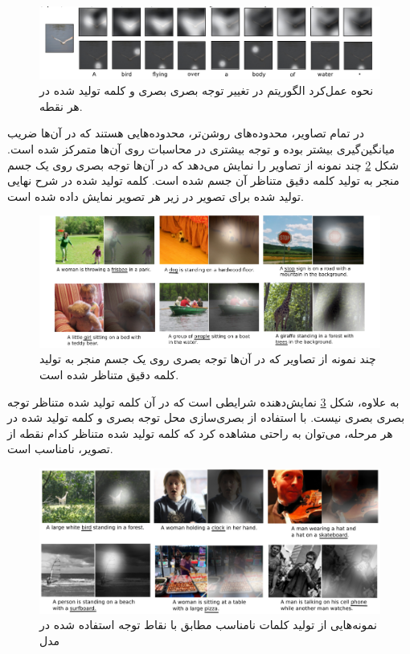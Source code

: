 \begin{figure}[h]
\centering
\includegraphics[scale=0.4]{Imgs/show1.png}
\caption{نحوه عمل‌کرد الگوریتم در تغییر توجه بصری بصری و کلمه تولید شده در هر نقطه. \cite{xu2015show}}
\label{fig:show1}
\end{figure}  
  
  در تمام تصاویر، محدوده‌های روشن‌تر، محدوده‌هایی هستند که در آن‌ها ضریب میانگین‌گیری بیشتر بوده و توجه بیشتری در محاسبات روی آن‌ها متمرکز شده است. شکل \ref{fig:show2} چند نمونه از تصاویر را نمایش می‌دهد که در آن‌ها توجه بصری روی یک جسم منجر به تولید کلمه دقیق متناظر آن جسم شده است. کلمه تولید شده در شرح نهایی تولید شده برای تصویر در زیر هر تصویر نمایش داده شده است.

\begin{figure}[h]
\centering
\includegraphics[scale=0.5]{Imgs/show2.png}
\caption{چند نمونه از تصاویر که در آن‌ها توجه بصری روی یک جسم منجر به تولید کلمه دقیق متناظر شده است\cite{xu2015show}. }
\label{fig:show2}
\end{figure}

  به علاوه، شکل \ref{fig:show3} نمایش‌دهنده شرایطی است که در آن کلمه تولید شده متناظر توجه بصری بصری نیست. با استفاده از بصری‌سازی محل توجه بصری و کلمه تولید شده در هر مرحله، می‌توان به راحتی مشاهده کرد که کلمه تولید شده متناظر کدام نقطه از تصویر،‌ نامناسب است.
  
  \begin{figure}[h]
  \centering
  \includegraphics[scale=0.4]{Imgs/show3.png}
  \caption{نمونه‌هایی از تولید کلمات نامناسب مطابق با نقاط توجه استفاده شده در مدل‌\cite{xu2015show}}
  \label{fig:show3}
  \end{figure}
    
